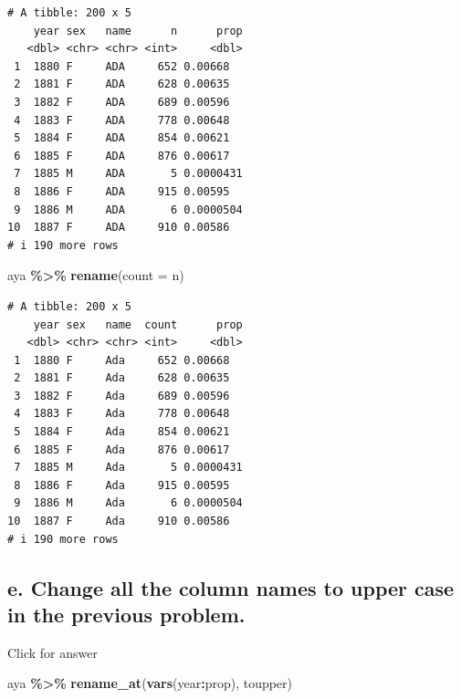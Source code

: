 \documentclass[
]{book}
\newenvironment{Shaded}{\begin{snugshade}}{\end{snugshade}}
\newcommand{\AttributeTok}[1]{\textcolor[rgb]{0.13,0.29,0.53}{#1}}
\newcommand{\FunctionTok}[1]{\textcolor[rgb]{0.13,0.29,0.53}{\textbf{#1}}}
\newcommand{\NormalTok}[1]{#1}
\newcommand{\SpecialCharTok}[1]{\textcolor[rgb]{0.81,0.36,0.00}{\textbf{#1}}}
\begin{document}
\begin{verbatim}
# A tibble: 200 x 5
    year sex   name      n      prop
   <dbl> <chr> <chr> <int>     <dbl>
 1  1880 F     ADA     652 0.00668  
 2  1881 F     ADA     628 0.00635  
 3  1882 F     ADA     689 0.00596  
 4  1883 F     ADA     778 0.00648  
 5  1884 F     ADA     854 0.00621  
 6  1885 F     ADA     876 0.00617  
 7  1885 M     ADA       5 0.0000431
 8  1886 F     ADA     915 0.00595  
 9  1886 M     ADA       6 0.0000504
10  1887 F     ADA     910 0.00586  
# i 190 more rows
\end{verbatim}

\begin{Shaded}
\begin{Highlighting}[]
\NormalTok{aya }\SpecialCharTok{\%\textgreater{}\%} \FunctionTok{rename}\NormalTok{(}\AttributeTok{count =}\NormalTok{ n)}
\end{Highlighting}
\end{Shaded}

\begin{verbatim}
# A tibble: 200 x 5
    year sex   name  count      prop
   <dbl> <chr> <chr> <int>     <dbl>
 1  1880 F     Ada     652 0.00668  
 2  1881 F     Ada     628 0.00635  
 3  1882 F     Ada     689 0.00596  
 4  1883 F     Ada     778 0.00648  
 5  1884 F     Ada     854 0.00621  
 6  1885 F     Ada     876 0.00617  
 7  1885 M     Ada       5 0.0000431
 8  1886 F     Ada     915 0.00595  
 9  1886 M     Ada       6 0.0000504
10  1887 F     Ada     910 0.00586  
# i 190 more rows
\end{verbatim}

\hypertarget{e.-change-all-the-column-names-to-upper-case-in-the-previous-problem.}{%
\subsection{e. Change all the column names to upper case in the previous problem.}\label{e.-change-all-the-column-names-to-upper-case-in-the-previous-problem.}}

Click for answer

\begin{Shaded}
\begin{Highlighting}[]
\NormalTok{aya }\SpecialCharTok{\%\textgreater{}\%} \FunctionTok{rename\_at}\NormalTok{(}\FunctionTok{vars}\NormalTok{(year}\SpecialCharTok{:}\NormalTok{prop), toupper)}
\end{Highlighting}
\end{Shaded}
\end{document}

